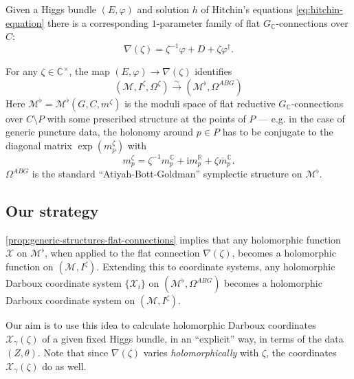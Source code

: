 \documentclass[12pt,letterpaper,reqno]{article}
\numberwithin{equation}{section}
\newcommand{\cM}{\ensuremath{\mathcal M}}
\newcommand{\cX}{\ensuremath{\mathcal X}}
\newcommand{\R}{\ensuremath{\mathbb R}}
\newcommand{\C}{\ensuremath{\mathbb C}}
\newcommand{\I}{{\mathrm i}}
\newcommand{\simarrow}{\xrightarrow\sim}
\newcommand{\ti}[1]{\textit{#1}}
\begin{document}
Given a Higgs bundle $(E,\varphi)$ and 
solution $h$ of Hitchin's equations \eqref{eq:hitchin-equation}
there is a corresponding $1$-parameter family of flat
$G_\C$-connections over $C$:
\begin{equation}
  \nabla(\zeta) = \zeta^{-1} \varphi + D + \zeta \varphi^\dagger.
\end{equation}

\begin{prop} \label{prop:generic-structures-flat-connections} For any $\zeta \in \C^\times$,
the map $(E,\varphi) \to \nabla(\zeta)$ identifies
\begin{equation}
  (\cM, I^\zeta, \Omega^\zeta) \simarrow (\cM^\flat, \Omega^{ABG})
\end{equation}
Here $\cM^\flat = \cM^\flat(G, C, m^\zeta)$
is the moduli space of flat reductive 
$G_\C$-connections over $C \setminus P$ 
with some prescribed structure at the points of $P$ 
---
e.g. in the case of generic puncture data,
the holonomy around $p \in P$ has to be conjugate to 
the diagonal matrix $\exp(m^\zeta_p)$ with
\begin{equation}
m^{\zeta}_p = \zeta^{-1} m_p^\C + \I m_p^\R + \zeta \overline{m}_p^\C. 
\end{equation}
$\Omega^{ABG}$ is the standard ``Atiyah-Bott-Goldman'' symplectic
structure on $\cM^\flat$.
\end{prop}


\subsection{Our strategy}

\autoref{prop:generic-structures-flat-connections} 
implies that any holomorphic function $\cX$ on $\cM^\flat$,
when applied to
the flat connection $\nabla(\zeta)$, becomes a holomorphic
function on $(\cM, I^\zeta)$.
Extending this to coordinate systems, any holomorphic 
Darboux coordinate system $\{\cX_i\}$ on $(\cM^\flat, \Omega^{ABG})$
becomes a holomorphic Darboux coordinate system on
$(\cM, I^\zeta)$.

Our aim is to use this idea to calculate holomorphic Darboux
coordinates $\cX_\gamma(\zeta)$ of a given fixed Higgs bundle,
in an ``explicit'' way,
in terms of the data $(Z, \theta)$.
Note that since $\nabla(\zeta)$ varies
\ti{holomorphically} with $\zeta$, the coordinates
$\cX_\gamma(\zeta)$ do as well.
\end{document}
